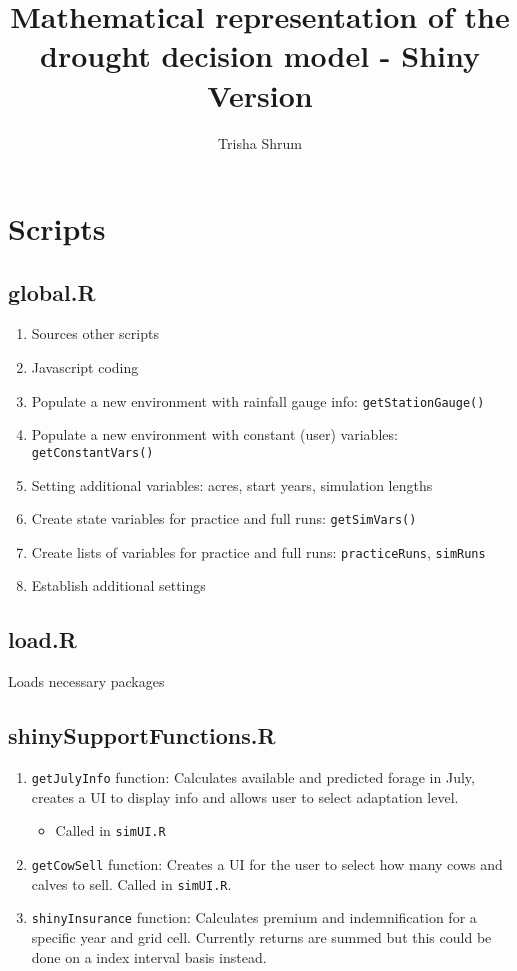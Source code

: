 \documentclass[11pt]{article}
\title{Mathematical representation of the drought decision model - Shiny Version}
\author{Trisha Shrum}
\begin{document}
\maketitle
 
\section{Scripts}

\subsection{global.R}
\begin{enumerate}
\item Sources other scripts
\item Javascript coding
\item Populate a new environment with rainfall gauge info: \verb!getStationGauge()!
\item Populate a new environment with constant (user) variables: \verb!getConstantVars()!
\item Setting additional variables: acres, start years, simulation lengths
\item Create state variables for practice and full runs: \verb!getSimVars()!
\item Create lists of variables for practice and full runs: \verb!practiceRuns!, \verb!simRuns!
\item Establish additional settings
\end{enumerate}  
 
\subsection{load.R}
Loads necessary packages

\subsection{shinySupportFunctions.R}
\begin{enumerate}
\item \verb!getJulyInfo! function: Calculates available and predicted forage in July, creates a
    UI to display info and allows user to select adaptation level.
    \begin{itemize}
    \item Called in \verb!simUI.R!
    \end{itemize}
\item \verb!getCowSell! function: Creates a UI for the user to select how many cows and calves to sell. Called in \verb!simUI.R!.
\item \verb!shinyInsurance! function: Calculates premium and indemnification for a specific year and
  grid cell. Currently returns are summed but this could be done on a index interval basis instead.
\end{enumerate}
\end{document}
